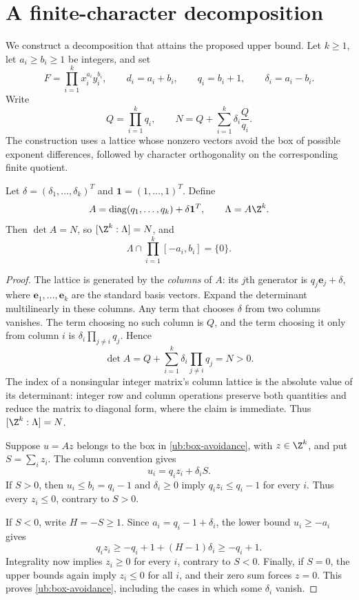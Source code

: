 \section{A finite-character decomposition}
\label{ub:section}

We construct a decomposition that attains the proposed upper bound.
Let $k\geq 1$, let $a_i\geq b_i\geq 1$ be integers, and set
\[
 F=\prod_{i=1}^k x_i^{a_i}y_i^{b_i},\qquad
 d_i=a_i+b_i,\qquad q_i=b_i+1,\qquad \delta_i=a_i-b_i.
\]
Write
\begin{equation}
 Q=\prod_{i=1}^k q_i,
 \qquad
 N=Q+\sum_{i=1}^k\delta_i\frac{Q}{q_i}.
 \label{ub:N}
\end{equation}
The construction uses a lattice whose nonzero vectors avoid the box of
possible exponent differences, followed by character orthogonality on
the corresponding finite quotient.

\begin{lemma}
\label{ub:lattice}
Let $\delta=(\delta_1,\ldots,\delta_k)^T$ and
$\mathbf{1}=(1,\ldots,1)^T$. Define
\[
 A=\operatorname{diag}(q_1,\ldots,q_k)+\delta\mathbf{1}^T,
 \qquad \Lambda=A\Z^k.
\]
Then $\det A=N$, so $[\Z^k:\Lambda]=N$, and
\begin{equation}
 \Lambda\cap\prod_{i=1}^k[-a_i,b_i]=\{0\}.
 \label{ub:box-avoidance}
\end{equation}
\end{lemma}

\begin{proof}
The lattice is generated by the \emph{columns} of $A$: its $j$th
generator is $q_j\mathbf{e}_j+\delta$, where
$\mathbf{e}_1,\ldots,\mathbf{e}_k$ are the standard basis vectors.
Expand the determinant multilinearly in these columns. Any term that
chooses $\delta$ from two columns vanishes. The term choosing no such
column is $Q$, and the term choosing it only from column $i$ is
$\delta_i\prod_{j\ne i}q_j$. Hence
\[
 \det A=Q+\sum_{i=1}^k\delta_i\prod_{j\ne i}q_j=N>0.
\]
The index of a nonsingular integer matrix's column lattice is the absolute
value of its determinant: integer row and column operations preserve
both quantities and reduce the matrix to diagonal form, where the claim
is immediate. Thus $[\Z^k:\Lambda]=N$.

Suppose $u=Az$ belongs to the box in \eqref{ub:box-avoidance}, with
$z\in\Z^k$, and put $S=\sum_i z_i$. The column convention gives
\begin{equation}
 u_i=q_i z_i+\delta_i S.
 \label{ub:lattice-coordinates}
\end{equation}
If $S>0$, then $u_i\leq b_i=q_i-1$ and $\delta_i\geq0$ imply
$q_i z_i\leq q_i-1$ for every $i$. Thus every $z_i\leq0$, contrary
to $S>0$.

If $S<0$, write $H=-S\geq1$. Since
$a_i=q_i-1+\delta_i$, the lower bound $u_i\geq-a_i$ gives
\[
 q_i z_i\geq-q_i+1+(H-1)\delta_i\geq-q_i+1.
\]
Integrality now implies $z_i\geq0$ for every $i$, contrary to $S<0$.
Finally, if $S=0$, the upper bounds again imply $z_i\leq0$ for all
$i$, and their zero sum forces $z=0$. This proves
\eqref{ub:box-avoidance}, including the cases in which some
$\delta_i$ vanish.
\end{proof}

